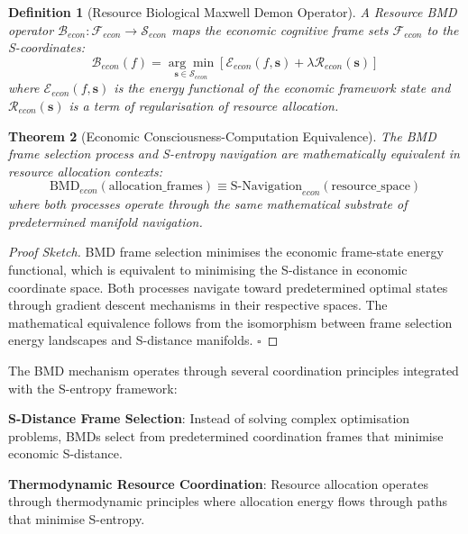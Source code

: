 \documentclass[12pt,a4paper]{article}
\newtheorem{theorem}{Theorem}
\newtheorem{definition}[theorem]{Definition}
\begin{document}
\begin{definition}[Resource Biological Maxwell Demon Operator]
A Resource BMD operator $\mathcal{B}_{econ}: \mathcal{F}_{econ} \to \mathcal{S}_{econ}$ maps the economic cognitive frame sets $\mathcal{F}_{econ}$ to the S-coordinates:
\begin{equation}
\mathcal{B}_{econ}(f) = \underset{\mathbf{s} \in \mathcal{S}_{econ}}{\arg\min} \left[ \mathcal{E}_{econ}(f, \mathbf{s}) + \lambda \mathcal{R}_{econ}(\mathbf{s}) \right]
\end{equation}
where $\mathcal{E}_{econ}(f, \mathbf{s})$ is the energy functional of the economic framework state and $\mathcal{R}_{econ}(\mathbf{s})$ is a term of regularisation of resource allocation.
\end{definition}

\begin{theorem}[Economic Consciousness-Computation Equivalence]
The BMD frame selection process and S-entropy navigation are mathematically equivalent in resource allocation contexts:
\begin{equation}
\text{BMD}_{econ}(\text{allocation\_frames}) \equiv \text{S-Navigation}_{econ}(\text{resource\_space})
\end{equation}
where both processes operate through the same mathematical substrate of predetermined manifold navigation.
\end{theorem}

\begin{proof}[Proof Sketch]
BMD frame selection minimises the economic frame-state energy functional, which is equivalent to minimising the S-distance in economic coordinate space. Both processes navigate toward predetermined optimal states through gradient descent mechanisms in their respective spaces. The mathematical equivalence follows from the isomorphism between frame selection energy landscapes and S-distance manifolds. $\square$
\end{proof}

The BMD mechanism operates through several coordination principles integrated with the S-entropy framework:

\textbf{S-Distance Frame Selection}: Instead of solving complex optimisation problems, BMDs select from predetermined coordination frames that minimise economic S-distance.

\textbf{Thermodynamic Resource Coordination}: Resource allocation operates through thermodynamic principles where allocation energy flows through paths that minimise S-entropy.
\end{document}
